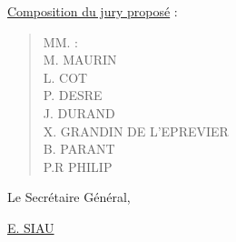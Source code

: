 \uline{Composition du jury proposé} :
\begin{quote}MM. :\\M. MAURIN\\L. COT\\P. DESRE\\J. DURAND\\X. GRANDIN DE L'EPREVIER\\B. PARANT\\P.R PHILIP\end{quote}
\begin{flushright}Le Secrétaire Général,\end{flushright}
\begin{flushright}\uline{E. SIAU}\end{flushright}
